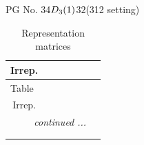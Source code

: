 \documentclass[fleqn,8pt,landscape]{jsarticle}
\begin{document}
\setcounter{MaxMatrixCols}{32}

\renewcommand{\tablename}{Table~}
\renewcommand{\figurename}{Figure~}
\begin{center}
\LARGE
PG No. 34\quad$D_{\rm 3}(1)$\quad$32$\quad(312 setting)\quad[ trigonal ]
\end{center}
\renewcommand{\arraystretch}{1.2}
\begin{longtable}{ccccccc}
\caption{Representation matrices}
 \\
 \hline \hline
Irrep. &  &  &  &  &  &  \\ \hline \endfirsthead

\multicolumn{6}{l}{\tablename\ \thetable{}} \\
 \hline \hline
Irrep. &  &  &  &  &  &  \\ \hline \endhead

 \hline \hline
\multicolumn{6}{r}{\footnotesize\it continued ...} \\ \endfoot

 \hline \hline
\multicolumn{6}{r}{} \\ \endlastfoot


\end{longtable}
\end{document}
